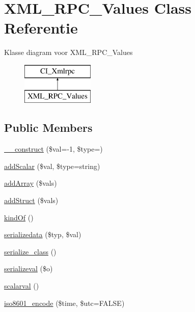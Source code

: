 \hypertarget{class_x_m_l___r_p_c___values}{}\section{X\+M\+L\+\_\+\+R\+P\+C\+\_\+\+Values Class Referentie}
\label{class_x_m_l___r_p_c___values}
Klasse diagram voor X\+M\+L\+\_\+\+R\+P\+C\+\_\+\+Values\begin{figure}[H]
\begin{center}
\leavevmode
\includegraphics[height=2.000000cm]{class_x_m_l___r_p_c___values}
\end{center}
\end{figure}
\subsection*{Public Members}
\begin{DoxyCompactItemize}
\item 
\mbox{\hyperlink{class_x_m_l___r_p_c___values_af3d459d43acf9109a9604d02b12ccf44}{\+\_\+\+\_\+construct}} (\$val=-\/1, \$type=\textquotesingle{}\textquotesingle{})
\item 
\mbox{\hyperlink{class_x_m_l___r_p_c___values_ac847166eee63ab7bfaa8b0e22ae19430}{add\+Scalar}} (\$val, \$type=\textquotesingle{}string\textquotesingle{})
\item 
\mbox{\hyperlink{class_x_m_l___r_p_c___values_a2081e6a72b7e1c15f8c1dbcdfa673d4c}{add\+Array}} (\$vals)
\item 
\mbox{\hyperlink{class_x_m_l___r_p_c___values_a5dbdf0121566791a201cd07a3de15531}{add\+Struct}} (\$vals)
\item 
\mbox{\hyperlink{class_x_m_l___r_p_c___values_a3b169c364729cee2afdccadef5229f80}{kind\+Of}} ()
\item 
\mbox{\hyperlink{class_x_m_l___r_p_c___values_a7058e00e310218c447d3c9fea0ee0a3d}{serializedata}} (\$typ, \$val)
\item 
\mbox{\hyperlink{class_x_m_l___r_p_c___values_a59df3d3c8fbb47a946d6a29f0b3c8e0c}{serialize\+\_\+class}} ()
\item 
\mbox{\hyperlink{class_x_m_l___r_p_c___values_a1a4bfc79985c185745d96ebe3a1e5c3d}{serializeval}} (\$o)
\item 
\mbox{\hyperlink{class_x_m_l___r_p_c___values_ac9a3751dc2d5479f409d0a4683c37d26}{scalarval}} ()
\item 
\mbox{\hyperlink{class_x_m_l___r_p_c___values_a201f99ae311bb2c53526933576c890d0}{iso8601\+\_\+encode}} (\$time, \$utc=F\+A\+L\+SE)
\end{DoxyCompactItemize}
